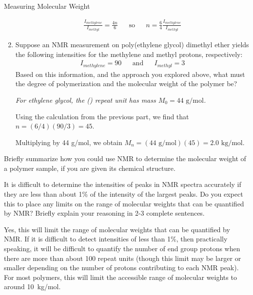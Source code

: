 \begin{activity}{Measuring Molecular Weight}
\begin{ctqs}
\begin{enumerate}
				\begin{solution}[1.25in]
					\begin{align*}
						\frac{I_{methylene}}{I_{methyl}} = \frac{4n}{6} && \text{so} && n = \frac{6}{4}\frac{I_{methylene}}{I_{methyl}}
					\end{align*}
				\end{solution}
				
			\item Suppose an NMR measurement on poly(ethylene glycol) dimethyl ether yields the following intensities for the methylene and methyl protons, respectively:
				\begin{align*}
					I_{methylene}=90 && \text{and} &&
					I_{methyl}=3
				\end{align*}
				Based on this information, and the approach you explored above, what must the degree of polymerization and the molecular weight of the polymer be?
				
				\emph{For ethylene glycol, the () repeat unit has mass $M_0=44\text{ g/mol}$.}
				
				\begin{solution}[1.5in]
					Using the calculation from the previous part, we find that $n = (6/4)(90/3) = 45$.
					
					Multiplying by 44 g/mol, we obtain $M_n = (44\text{ g/mol})(45) = 2.0\text{ kg/mol}$.
				\end{solution}
				
		\end{enumerate}
		
		\question Briefly summarize how you could use NMR to determine the molecular weight of a polymer sample, if you are given its chemical structure.
		
			\begin{solution}[2in]
			\end{solution}
		
		\question It is difficult to determine the intensities of peaks in NMR spectra accurately if they are less than about 1\% of the intensity of the largest peaks.  Do you expect this to place any limits on the range of molecular weights that can be quantified by NMR?  Briefly explain your reasoning in 2-3 complete sentences.
		
			\begin{solution}[2in]
				Yes, this will limit the range of molecular weights that can be quantified by NMR.  If it is difficult to detect intensities of less than 1\%, then practically speaking, it will be difficult to quantify the number of end group protons when there are more than about 100 repeat units (though this limit may be larger or smaller depending on the number of protons contributing to each NMR peak).  For most polymers, this will limit the accessible range of molecular weights to around 10~kg/mol.
			\end{solution}
	

\end{ctqs}
\end{activity}
